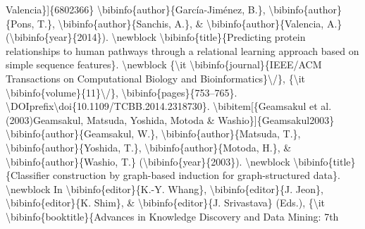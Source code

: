 \documentclass{article}%
\begin{document}
Valencia\}{]}\{6802366\}\newline%
\textbackslash{}bibinfo\{author\}\{García{-}Jiménez, B.\}, \textbackslash{}bibinfo\{author\}\{Pons, T.\},\newline%
\textbackslash{}bibinfo\{author\}\{Sanchis, A.\}, \& \textbackslash{}bibinfo\{author\}\{Valencia, A.\}\newline%
(\textbackslash{}bibinfo\{year\}\{2014\}).\newline%
\textbackslash{}newblock \textbackslash{}bibinfo\{title\}\{Predicting protein relationships to human pathways\newline%
through a relational learning approach based on simple sequence features\}.\newline%
\textbackslash{}newblock \{\textbackslash{}it \textbackslash{}bibinfo\{journal\}\{IEEE/ACM Transactions on Computational Biology\newline%
and Bioinformatics\}\textbackslash{}/\}, \{\textbackslash{}it \textbackslash{}bibinfo\{volume\}\{11\}\textbackslash{}/\},\newline%
\textbackslash{}bibinfo\{pages\}\{753–765\}. \textbackslash{}DOIprefix\textbackslash{}doi\{10.1109/TCBB.2014.2318730\}.\newline%
\textbackslash{}bibitem{[}\{Geamsakul et al.(2003)Geamsakul, Matsuda, Yoshida, Motoda \&\newline%
Washio\}{]}\{Geamsakul2003\}\newline%
\textbackslash{}bibinfo\{author\}\{Geamsakul, W.\}, \textbackslash{}bibinfo\{author\}\{Matsuda, T.\},\newline%
\textbackslash{}bibinfo\{author\}\{Yoshida, T.\}, \textbackslash{}bibinfo\{author\}\{Motoda, H.\}, \&\newline%
\textbackslash{}bibinfo\{author\}\{Washio, T.\} (\textbackslash{}bibinfo\{year\}\{2003\}).\newline%
\textbackslash{}newblock \textbackslash{}bibinfo\{title\}\{Classifier construction by graph{-}based induction for\newline%
graph{-}structured data\}.\newline%
\textbackslash{}newblock In \textbackslash{}bibinfo\{editor\}\{K.{-}Y. Whang\}, \textbackslash{}bibinfo\{editor\}\{J. Jeon\},\newline%
\textbackslash{}bibinfo\{editor\}\{K. Shim\}, \& \textbackslash{}bibinfo\{editor\}\{J. Srivastava\} (Eds.), \{\textbackslash{}it\newline%
\textbackslash{}bibinfo\{booktitle\}\{Advances in Knowledge Discovery and Data Mining: 7th\newline%
\end{document}
